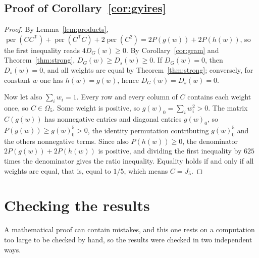 \documentclass[11pt,a4paper]{article}
\theoremstyle{definition}
\theoremstyle{remark}
\newcommand{\per}{\operatorname{per}}
\newcommand{\T}{\mathsf{T}}
\begin{document}
\subsection{Proof of Corollary~\ref{cor:gyires}}

\begin{proof}
By Lemma~\ref{lem:products},
$\per(CC^\T)+\per(C^\T C)+2\per(C^2)=2P(g(w))+2P(h(w))$, so the first inequality reads $4D_G(w)\ge0$. By
Corollary~\ref{cor:gram} and Theorem~\ref{thm:strong}, $D_G(w)\ge D_s(w)\ge0$. If $D_G(w)=0$, then $D_s(w)=0$, and
all weights are equal by Theorem~\ref{thm:strong}; conversely, for constant $w$ one has $h(w)=g(w)$, hence
$D_G(w)=D_s(w)=0$.

Now let also $\sum_iw_i=1$. Every row and every column of $C$ contains each weight once, so $C\in\Omega_5$. Some weight
is positive, so $g(w)_0=\sum_iw_i^2>0$. The matrix $C(g(w))$ has nonnegative entries and diagonal entries $g(w)_0$, so
$P(g(w))\ge g(w)_0^5>0$, the identity permutation contributing $g(w)_0^5$ and the others nonnegative terms. Since also
$P(h(w))\ge0$, the denominator $2P(g(w))+2P(h(w))$ is positive, and dividing the first inequality by $625$ times the denominator gives
the ratio inequality. Equality holds if and only if all weights are equal, that is, equal to $1/5$, which means
$C=J_5$.
\end{proof}

\section{Checking the results}\label{sec:checks}

A mathematical proof can contain mistakes, and this one rests on a computation too large to be checked by hand, so the
results were checked in two independent ways.
\end{document}
